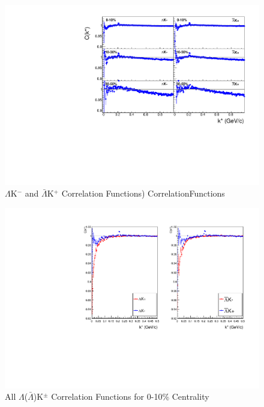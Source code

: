 \documentclass[../AnalysisNoteJBuxton.tex]{subfiles}
\begin{document}
\begin{figure}[h]
  \centering
  \includegraphics[width=\textwidth]{4_CorrelationFunctions/Figures/canKStarCfsLamKchMwConj.pdf}
  \caption[$\Lambda$K$^{-}$ and $\bar{\Lambda}$K$^{+}$ Correlation Functions]{$\Lambda$K$^{-}$ and $\bar{\Lambda}$K$^{+}$ Correlation Functions) CorrelationFunctions}
  \label{fig:LamKchMwConjCfs}
\end{figure}

\begin{figure}[h]
  \centering
  \includegraphics[width=\textwidth]{4_CorrelationFunctions/Figures/canKStarCfLamKchP_0010.pdf}
  \caption[All $\Lambda$($\bar{\Lambda}$)K$^{\pm}$ Correlation Functions]{All $\Lambda$($\bar{\Lambda}$)K$^{\pm}$ Correlation Functions for 0-10\% Centrality}
  \label{fig:cLamcKchCfs0010}
\end{figure}
\end{document}

